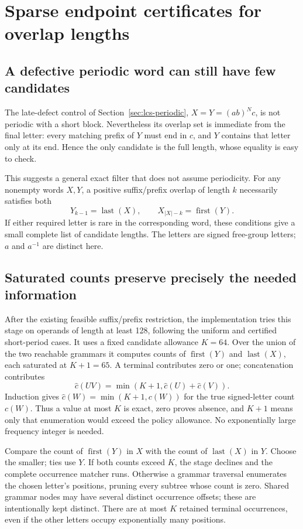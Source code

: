 \section{Sparse endpoint certificates for overlap lengths}
\label{sec:lcs-sparse}

\subsection{A defective periodic word can still have few candidates}

The late-defect control of Section~\ref{sec:lcs-periodic},
$X=Y=(ab)^Nc$, is not periodic with a short block. Nevertheless its
overlap set is immediate from the final letter: every matching prefix of
$Y$ must end in $c$, and $Y$ contains that letter only at its end. Hence
the only candidate is the full length, whose equality is easy to check.

This suggests a general exact filter that does not assume periodicity.
For any nonempty words $X,Y$, a positive suffix/prefix overlap of length
$k$ necessarily satisfies both
\[
 Y_{k-1}=\operatorname{last}(X),\qquad
 X_{|X|-k}=\operatorname{first}(Y).
\]
If either required letter is rare in the corresponding word, these
conditions give a small complete list of candidate lengths. The letters
are signed free-group letters; $a$ and $a^{-1}$ are distinct here.

\subsection{Saturated counts preserve precisely the needed information}

After the existing feasible suffix/prefix restriction, the implementation
tries this stage on operands of length at least 128, following the uniform
and certified short-period cases. It uses a fixed candidate allowance
$K=64$. Over the union of the two reachable grammars it computes counts
of $\operatorname{first}(Y)$ and $\operatorname{last}(X)$, each saturated
at $K+1=65$. A terminal contributes zero or one; concatenation contributes
\[
 \widehat c(UV)=\min(K+1,\widehat c(U)+\widehat c(V)).
\]
Induction gives $\widehat c(W)=\min(K+1,c(W))$ for the true signed-letter
count $c(W)$. Thus a value at most $K$ is exact, zero proves absence,
and $K+1$ means only that enumeration would exceed the policy allowance.
No exponentially large frequency integer is needed.

Compare the count of $\operatorname{first}(Y)$ in $X$ with the count of
$\operatorname{last}(X)$ in $Y$. Choose the smaller; ties use $Y$.
If both counts exceed $K$, the stage declines and the complete occurrence
matcher runs. Otherwise a grammar traversal enumerates the chosen letter's
positions, pruning every subtree whose count is zero. Shared grammar nodes
may have several distinct occurrence offsets; these are intentionally kept
distinct. There are at most $K$ retained terminal occurrences, even if the
other letters occupy exponentially many positions.

